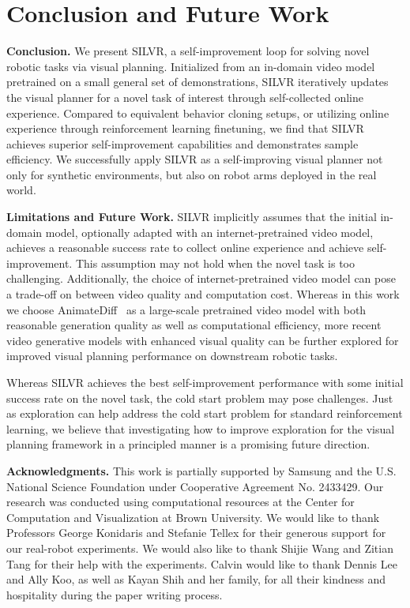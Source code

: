 \section{Conclusion and Future Work}
\vspace{-0.15em}

\textbf{Conclusion.} We present SILVR, a self-improvement loop for solving novel robotic tasks via visual planning.  Initialized from an in-domain video model pretrained on a small general set of demonstrations, SILVR iteratively updates the visual planner for a novel task of interest through self-collected online experience.  Compared to equivalent behavior cloning setups, or utilizing online experience through reinforcement learning finetuning, we find that SILVR achieves superior self-improvement capabilities and demonstrates sample efficiency.  %
We successfully apply SILVR as a self-improving visual planner not only for synthetic environments, but also on robot arms deployed in the real world.

\textbf{Limitations and Future Work.} SILVR implicitly assumes that the initial in-domain model, optionally adapted with an internet-pretrained video model, achieves a reasonable success rate to collect online experience and achieve self-improvement. This assumption may not hold when the novel task is too challenging. Additionally, the choice of internet-pretrained video model can pose a trade-off on between video quality and computation cost. Whereas in this work we choose AnimateDiff~\citep{guo2023animatediff} as a large-scale pretrained video model with both reasonable generation quality as well as computational efficiency, more recent video generative models with enhanced visual quality can be further explored for improved visual planning performance on downstream robotic tasks.

Whereas SILVR achieves the best self-improvement performance with some initial success rate on the novel task, the cold start problem may pose challenges.  Just as exploration can help address the cold start problem for standard reinforcement learning, we believe that investigating how to improve exploration for the visual planning framework in a principled manner is a promising future direction.

\textbf{Acknowledgments.} This work is partially supported by Samsung and the U.S. National Science Foundation under Cooperative Agreement No. 2433429. Our research was conducted using computational resources at the Center for Computation and Visualization at Brown University. We would like to thank Professors George Konidaris and Stefanie Tellex for their generous support for our real-robot experiments. We would also like to thank Shijie Wang and Zitian Tang for their help with the experiments. Calvin would like to thank Dennis Lee and Ally Koo, as well as Kayan Shih and her family, for all their kindness and hospitality during the paper writing process.


